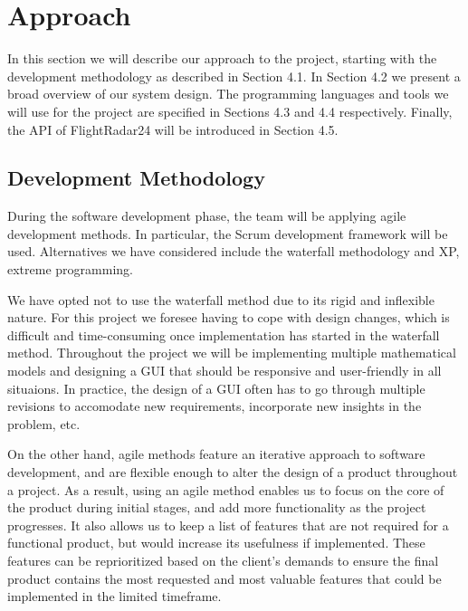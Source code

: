 \section{Approach}
In this section we will describe our approach to the project, starting with the development methodology as described in Section 4.1. In Section 4.2 we present a broad overview of our system design. The programming languages and tools we will use for the project are specified in Sections 4.3 and 4.4 respectively. Finally, the API of FlightRadar24 will be introduced in Section 4.5.

\subsection{Development Methodology}
During the software development phase, the team will be applying agile development methods. In particular, the Scrum development framework will be used. Alternatives we have considered include the waterfall methodology and XP, extreme programming.

We have opted not to use the waterfall method due to its rigid and inﬂexible nature. For this project we foresee having to cope with design changes, which is diﬃcult and time-consuming once implementation has started in the waterfall method. Throughout the project we will be implementing multiple mathematical models and designing a GUI that should be responsive and user-friendly in all situaions. In practice, the design of a GUI often has to go through multiple revisions to accomodate new requirements, incorporate new insights in the problem, etc. 

On the other hand, agile methods feature an iterative approach to software development, and are flexible enough to alter the design of a product throughout a project. As a result, using an agile method enables us to focus on the core of the product during initial stages, and add more functionality as the project progresses. It also allows us to keep a list of features that are not required for a functional product, but would increase its usefulness if implemented. These features can be reprioritized based on the client’s demands to ensure the ﬁnal product contains the most requested and most valuable features that could be implemented in the limited timeframe.

